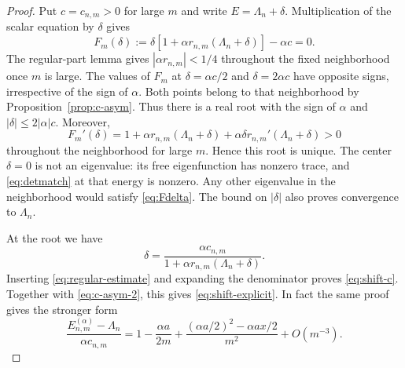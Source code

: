\documentclass[10pt,a4paper]{amsart}
\begin{document}
\begin{proof}
Put $c=c_{n,m}>0$ for large $m$ and write $E=\Lambda_n+\delta$.
Multiplication of the scalar equation by $\delta$ gives
\begin{equation}\label{eq:Fdelta}
F_m(\delta):=\delta[1+\alpha r_{n,m}(\Lambda_n+\delta)]-\alpha c=0.
\end{equation}
The regular-part lemma gives $|\alpha r_{n,m}|<1/4$ throughout the
fixed neighborhood once $m$ is large. The values of $F_m$ at $\delta=\alpha c/2$ and
$\delta=2\alpha c$ have opposite signs, irrespective of the sign of
$\alpha$.
Both points belong to that neighborhood by Proposition~\ref{prop:c-asym}.
Thus there is a real root with the sign of $\alpha$ and
$|\delta|\le2|\alpha|c$. Moreover,
$$
F_m'(\delta)=1+\alpha r_{n,m}(\Lambda_n+\delta)
+\alpha\delta r_{n,m}'(\Lambda_n+\delta)>0
$$
throughout the neighborhood for large $m$. Hence this root is unique.
The center $\delta=0$ is not an eigenvalue: its free eigenfunction has
nonzero trace, and \eqref{eq:detmatch} at that energy is nonzero.
Any other eigenvalue in the neighborhood would satisfy \eqref{eq:Fdelta}.
The bound on $|\delta|$ also proves convergence to $\Lambda_n$.

At the root we have
\begin{equation}\label{eq:delta-solve}
\delta=\frac{\alpha c_{n,m}}
{1+\alpha r_{n,m}(\Lambda_n+\delta)}.
\end{equation}
Inserting \eqref{eq:regular-estimate} and expanding the denominator proves
\eqref{eq:shift-c}. Together with \eqref{eq:c-asym-2}, this gives
\eqref{eq:shift-explicit}. In fact the same proof gives the stronger form
\begin{equation}\label{eq:shift-second}
\frac{E_{n,m}^{(\alpha)}-\Lambda_n}{\alpha c_{n,m}}
=1-\frac{\alpha a}{2m}
+\frac{(\alpha a/2)^2-\alpha ax/2}{m^2}+O(m^{-3}).
\end{equation}
\end{proof}
\end{document}

